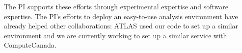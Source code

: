 The PI supports these efforts through experimental expertise and software expertise.  The PI's  efforts to deploy an easy-to-use analysis environment have already helped other collaborations: ATLAS used our code to set up a similar environment and we are currently working to set up a similar service with ComputeCanada.

